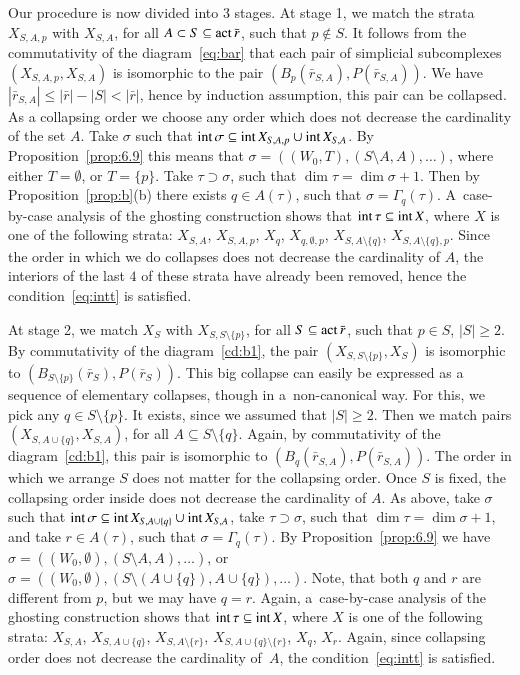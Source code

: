 \documentclass{amsart}[10pt]
\newcommand{\act}{\text{\rm act}\,}
\newcommand{\es}{\emptyset}
\newcommand{\inte}{\text{\rm int}\,}
\newcommand{\sm}{\setminus}
\newcommand{\tr}{{\bar r}}
\numberwithin{equation}{section}
\numberwithin{figure}{section}
\numberwithin{table}{section}
\begin{document}
Our procedure is now divided into $3$ stages.  At stage 1, we match
the strata $X_{S,A,p}$ with $X_{S,A}$, for all $A\subset S
\subseteq\act\tr$, such that $p\notin S$. It follows from the
commutativity of the diagram~\eqref{eq:bar} that each pair of
simplicial subcomplexes $(X_{S,A,p},X_{S,A})$ is isomorphic to the
pair $(B_p(\tr_{S,A}),P(\tr_{S,A}))$. We have
$|\tr_{S,A}|\leq|\tr|-|S|<|\tr|$, hence by induction assumption, this
pair can be collapsed. As a collapsing order we choose any order which
does not decrease the cardinality of the set $A$. Take $\sigma$ such
that $\inte\sigma\subseteq\inte X_{S,A,p}\cup\inte X_{S,A}$. By
Proposition~\ref{prop:6.9} this means that $\sigma=((W_0,T),(S\sm A,A),\dots)$,
where either $T=\es$, or $T=\{p\}$. Take $\tau\supset\sigma$,
such that $\dim\tau=\dim\sigma+1$. Then by Proposition~\ref{prop:b}(b) there exists
$q\in A(\tau)$, such that $\sigma=\Gamma_q(\tau)$. 
A~case-by-case analysis of the ghosting construction shows that 
$\inte\tau\subseteq\inte X$, where $X$ is one of the following strata:
$X_{S,A}$, $X_{S,A,p}$, $X_q$, $X_{q,\es,p}$, $X_{S,A\sm\{q\}}$, 
$X_{S,A\sm\{q\},p}$. Since the order in which we do collapses
does not decrease the cardinality of $A$, the interiors of the last $4$ of 
these strata have already been removed, hence the condition~\eqref{eq:intt}
is satisfied.

At stage 2, we match $X_S$ with $X_{S,S\sm\{p\}}$, for all
$S\subseteq\act\tr$, such that $p\in S$, $|S|\geq 2$. By commutativity of the 
diagram~\eqref{cd:b1}, the pair $(X_{S,S\sm\{p\}},X_S)$ is isomorphic to
$(B_{S\sm\{p\}}(\tr_S),P(\tr_S))$. This big collapse can easily be
expressed as a sequence of elementary collapses, though in
a~non-canonical way.  For this, we pick any $q\in S\sm\{p\}$. It
exists, since we assumed that $|S|\geq 2$.  Then we match pairs
$(X_{S,A\cup\{q\}},X_{S,A})$, for all $A\subseteq S\sm\{q\}$.  
Again, by commutativity of the diagram~\eqref{cd:b1}, this pair 
is isomorphic to $(B_q(\tr_{S,A}),P(\tr_{S,A}))$. The
order in which we arrange $S$ does not matter for the collapsing
order.  Once $S$ is fixed, the collapsing order inside does not
decrease the cardinality of $A$. As above, take $\sigma$ such
that $\inte\sigma\subseteq\inte X_{S,A\cup\{q\}}\cup\inte X_{S,A}$,
take $\tau\supset\sigma$, such that $\dim\tau=\dim\sigma+1$, and take
$r\in A(\tau)$, such that $\sigma=\Gamma_q(\tau)$. By
Proposition~\ref{prop:6.9} we have $\sigma=((W_0,\es),(S\sm A,A),\dots)$,
or $\sigma=((W_0,\es),(S\sm(A\cup\{q\}),A\cup\{q\}),\dots)$. Note,
that both $q$ and $r$ are different from $p$, but we may have $q=r$.
Again, a~case-by-case analysis of the ghosting construction shows that 
$\inte\tau\subseteq\inte X$, where $X$ is one of the following strata:
$X_{S,A}$, $X_{S,A\cup\{q\}}$, $X_{S,A\sm\{r\}}$, $X_{S,A\cup\{q\}\sm\{r\}}$, 
$X_q$, $X_r$. Again, since collapsing order does not decrease the cardinality
of~$A$, the condition~\eqref{eq:intt} is satisfied.
\end{document}

